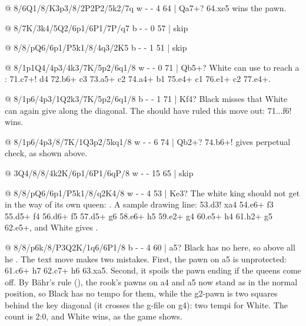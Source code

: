@ 8/6Q1/8/K3p3/8/2P2P2/5k2/7q w - - 4 64 | Qa7+?
64.\Q xe5 wins the pawn.

@ 8/7K/3k4/5Q2/6p1/6P1/7P/q7 b - - 0 57 | skip

@ 8/8/pQ6/6p1/P5k1/8/4q3/2K5 b - - 1 51 | skip

@ 8/1p1Q4/4p3/4k3/7K/5p2/6q1/8 w - - 0 71 | Qb5+?
White can use  to reach a : 71.\Q c7+!
\K d4 72.\Q b6+ \K c3 73.\Q a5+ \K c2 74.\Q a4+ \K b1 75.\Q e4+ \K c1 76.\Q e1+ \K c2 77.\Q e4+.

@ 8/1p6/4p3/1Q2k3/7K/5p2/6q1/8 b - - 1 71 | Kf4?
Black misses that White can again give  along the diagonal. The
 should have ruled this
move out: 71...\K f6! wins.

@ 8/1p6/4p3/8/7K/1Q3p2/5kq1/8 w - - 6 74 | Qb2+?
74.\Q b6+! gives perpetual check, as shown above.

@ 3Q4/8/8/4k2K/6p1/6P1/6qP/8 w - - 15 65 | skip

@ 8/8/pQ6/6p1/P5k1/8/q2K4/8 w - - 4 53 | Ke3?
The white king should not get in the way of its own queen:
. A sample drawing line: 53.\K d3! \Q xa4
54.\Q e6+ \K f3 55.\Q d5+ \K f4 56.\Q d6+ \K f5 57.\Q d5+ \K g6 58.\Q e6+ \K h5 59.\Q e2+ g4
60.\Q e5+ \K h4 61.\Q h2+ \K g5 62.\Q e5+, and White gives .

@ 8/8/p6k/8/P3Q2K/1q6/6P1/8 b - - 4 60 | a5?
Black has no  here, so above all he .
The text move makes two mistakes. First, the pawn on a5 is unprotected: 61.\Q c6+ \K h7 62.\Q c7+
\K h6 63.\Q xa5. Second, it spoils the pawn ending if the queens come off. By Bähr's rule
(), the rook's pawns on a4 and a5
now stand as in the normal position, so Black has no tempo for them, while the g2-pawn is two
squares behind the key diagonal (it crosses the g-file on g4): two tempi for White. The count is
2:0, and White wins, as the game shows.

